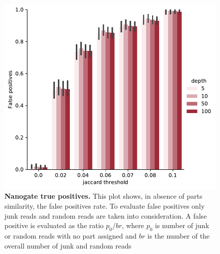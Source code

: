 \documentclass[11pt, a4paper]{article}
\begin{document}
 \begin{figure}[ht]
    \begin{center}
    \includegraphics[width=1.35\textwidth]{../results/images_notebook/v_450/sim_00_false_positive.pdf}
    \end{center}
    \caption{{\bf Nanogate true positives.}  This plot shows, in absence of parts similarity, the false positives rate. To evaluate false positives only junk reads and random reads are taken into consideration. A false positive is evaluated as the ratio 
    $p_0/br$, where $p_0$ is number of junk or random reads with no part assigned and $br$ is the number of the overall number of junk and random reads}
   \label{fig:v_450_sim_00_false_positives}
\end{figure}
\end{document}

